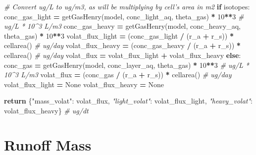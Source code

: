 \documentclass[]{article}
\newenvironment{Shaded}{\begin{snugshade}}{\end{snugshade}}
\newcommand{\DecValTok}[1]{\textcolor[rgb]{0.00,0.00,0.81}{{#1}}}
\newcommand{\StringTok}[1]{\textcolor[rgb]{0.31,0.60,0.02}{{#1}}}
\newcommand{\CommentTok}[1]{\textcolor[rgb]{0.56,0.35,0.01}{\textit{{#1}}}}
\newcommand{\VariableTok}[1]{\textcolor[rgb]{0.00,0.00,0.00}{{#1}}}
\newcommand{\ControlFlowTok}[1]{\textcolor[rgb]{0.13,0.29,0.53}{\textbf{{#1}}}}
\newcommand{\OperatorTok}[1]{\textcolor[rgb]{0.81,0.36,0.00}{\textbf{{#1}}}}
\newcommand{\NormalTok}[1]{{#1}}
\begin{document}
\begin{Shaded}
\begin{Highlighting}[]
    \CommentTok{# Convert ug/L to ug/m3, as will be multiplying by cell's area in m2}
    \ControlFlowTok{if} \NormalTok{isotopes:}
        \NormalTok{conc_gas_light }\OperatorTok{=} \NormalTok{getGasHenry(model, conc_light_aq, theta_gas) }\OperatorTok{*} \DecValTok{10}\OperatorTok{**}\DecValTok{3}  \CommentTok{# ug/L * 10^3 L/m3}
        \NormalTok{conc_gas_heavy }\OperatorTok{=} \NormalTok{getGasHenry(model, conc_heavy_aq, theta_gas) }\OperatorTok{*} \DecValTok{10}\OperatorTok{**}\DecValTok{3}
        \NormalTok{volat_flux_light }\OperatorTok{=} \NormalTok{(conc_gas_light }\OperatorTok{/} \NormalTok{(r_a }\OperatorTok{+} \NormalTok{r_s)) }\OperatorTok{*} \NormalTok{cellarea()  }\CommentTok{# ug/day}
        \NormalTok{volat_flux_heavy }\OperatorTok{=} \NormalTok{(conc_gas_heavy }\OperatorTok{/} \NormalTok{(r_a }\OperatorTok{+} \NormalTok{r_s)) }\OperatorTok{*} \NormalTok{cellarea()  }\CommentTok{# ug/day}
        \NormalTok{volat_flux }\OperatorTok{=} \NormalTok{volat_flux_light }\OperatorTok{+} \NormalTok{volat_flux_heavy}
    \ControlFlowTok{else}\NormalTok{:}
        \NormalTok{conc_gas }\OperatorTok{=} \NormalTok{getGasHenry(model, conc_layer_aq, theta_gas) }\OperatorTok{*} \DecValTok{10}\OperatorTok{**}\DecValTok{3}  \CommentTok{# ug/L * 10^3 L/m3}
        \NormalTok{volat_flux }\OperatorTok{=} \NormalTok{(conc_gas }\OperatorTok{/} \NormalTok{(r_a }\OperatorTok{+} \NormalTok{r_s)) }\OperatorTok{*} \NormalTok{cellarea()  }\CommentTok{# ug/day}
        \NormalTok{volat_flux_light }\OperatorTok{=} \VariableTok{None}
        \NormalTok{volat_flux_heavy }\OperatorTok{=} \VariableTok{None}

    \ControlFlowTok{return} \NormalTok{\{}\StringTok{"mass_volat"}\NormalTok{: volat_flux,}
            \CommentTok{"light_volat"}\NormalTok{: volat_flux_light,}
            \CommentTok{"heavy_volat"}\NormalTok{: volat_flux_heavy\}  }\CommentTok{# ug/dt}
            
\end{Highlighting}
\end{Shaded}

\section{Runoff Mass}\label{runoff-mass}
\end{document}
